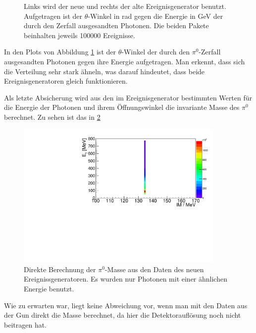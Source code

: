 \documentclass[a4paper,11pt,oneside,final,german,openbib,pdftex]{scrbook}
\begin{document}
{\begin{figure}[h!]
	\caption[Simulation: Vergleich der der Ereignisgeneratoren]{Links wird der neue und rechts der alte Ereignisgenerator benutzt. Aufgetragen ist der $\theta$-Winkel in rad gegen die Energie in GeV der durch den Zerfall ausgesandten Photonen. Die beiden Pakete beinhalten jeweils 100000 Ereignisse.}
	\label{fig:Vergleich-der-beiden-Guns}
\end{figure}

In den Plots von Abbildung \ref{fig:Vergleich-der-beiden-Guns} ist der $\theta$-Winkel der durch den $\pi^0$-Zerfall ausgesandten Photonen gegen ihre Energie aufgetragen. 
Man erkennt, dass sich die Verteilung sehr stark \"ahneln, was darauf hindeutet, dass beide Ereignisgeneratoren gleich funktionieren.

Als letzte Absicherung wird aus den im Ereignisgenerator bestimmten Werten f\"ur die Energie der Photonen und ihrem \"Offnungswinkel die invariante Masse des $\pi^0$ berechnet. Zu sehen ist das in \cref{fig:Direkte-Berechnung-der-PI-Masse}

\begin{figure}[h!]
	\centering

		\centering
		\includegraphics[width=0.9\textwidth]{20172504MCTrueME1}
		\caption[Simulation: Direkte Berechnung der $\pi^0$-Masse aus dem neuen Ereignisgenerator]{Direkte Berechnung der $\pi^0$-Masse aus den Daten des neuen Ereignissgeneratoren. Es wurden nur Photonen mit einer \"ahnlichen Energie benutzt.}
		\label{fig:Direkte-Berechnung-der-PI-Masse}

\end{figure}

Wie zu erwarten war, liegt keine Abweichung vor, wenn man mit den Daten aus der Gun direkt die Masse berechnet, da hier die Detektoraufl\"osung noch nicht beitragen hat.

}
\end{document}
